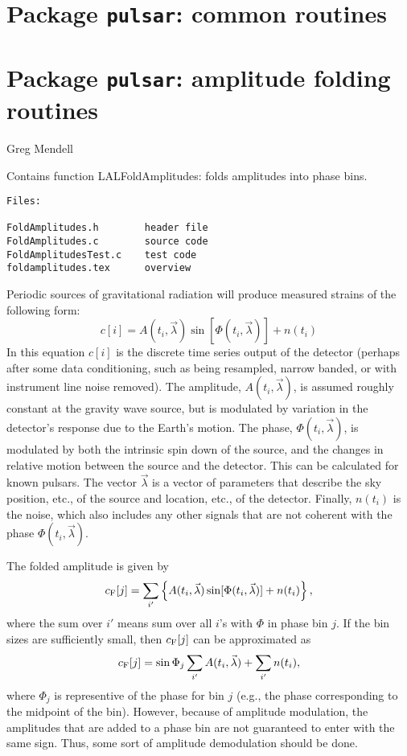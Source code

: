 \chapter{Package \texttt{pulsar}: common routines}

\chapter{Package \texttt{pulsar}: amplitude folding routines}
Greg Mendell
\bigskip

Contains function LALFoldAmplitudes: folds amplitudes into phase bins.

\begin{verbatim}
Files:

FoldAmplitudes.h       	header file
FoldAmplitudes.c       	source code
FoldAmplitudesTest.c   	test code
foldamplitudes.tex      overview
\end{verbatim}

Periodic sources of gravitational radiation will produce measured strains of the following form:
$$
c[i] = A(t_i,\vec{\lambda}) \sin[\Phi(t_i,\vec{\lambda})] + n(t_i)
$$
In this equation $c[i]$ is the discrete time series output of the detector (perhaps after some data conditioning, such as
being resampled, narrow banded, or with instrument line noise removed).
The amplitude, $A(t_i,\vec{\lambda})$, is assumed roughly constant at the gravity wave source,
but is modulated by variation in the detector's response due to the Earth's motion.  The phase, $\Phi(t_i,\vec{\lambda})$,
is modulated by both the intrinsic spin down of the source, and the changes in relative motion between the source
and the detector.  This can be calculated for known pulsars.  The vector $\vec{\lambda}$ is a vector of parameters
that describe the sky position, etc., of the source and location, etc., of the detector.
Finally, $n(t_i)$ is the noise, which also includes any other signals that are not coherent with
the phase $\Phi(t_i,\vec{\lambda})$.

The folded amplitude is given by
$$
c_{\rm F} [j] = \sum_{i'}
\left \{ A(t_i,\vec{\lambda})\sin[\Phi(t_i,\vec{\lambda})] + n(t_i) \right \} ,
$$
where the sum over $i'$ means sum over all $i$'s with $\Phi$ in phase bin $j$.
If the bin sizes are sufficiently small, then $c_{\rm F} [j]$ can be approximated as
$$
c_{\rm F} [j] = \sin\Phi_j\sum_{i'} A(t_i,\vec{\lambda}) + \sum_{i'} n(t_i) ,
$$
where $\Phi_j$ is representive of the phase for bin $j$ (e.g., the phase corresponding to the midpoint of the bin).
However, because of amplitude modulation, the amplitudes that are added to a phase bin are not guaranteed to enter
with the same sign.  Thus, some sort of amplitude demodulation should be done.

